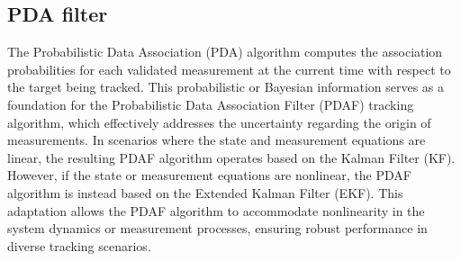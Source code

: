 \subsection{PDA filter}
\label{sec:pda_filter}
The Probabilistic Data Association (PDA) algorithm computes the association probabilities for each validated measurement at the current time with respect to the target being tracked. This probabilistic or Bayesian information serves as a foundation for the Probabilistic Data Association Filter (PDAF) tracking algorithm, which effectively addresses the uncertainty regarding the origin of measurements. In scenarios where the state and measurement equations are linear, the resulting PDAF algorithm operates based on the Kalman Filter (KF). However, if the state or measurement equations are nonlinear, the PDAF algorithm is instead based on the Extended Kalman Filter (EKF). This adaptation allows the PDAF algorithm to accommodate nonlinearity in the system dynamics or measurement processes, ensuring robust performance in diverse tracking scenarios.

